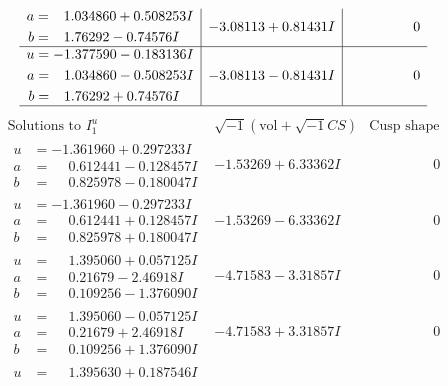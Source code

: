 \documentclass[1p]{elsarticle_modified}
\theoremstyle{definition}
\newcommand{\I}{\sqrt{-1}}
\begin{document}
$$\begin{array}{c|c|c}
\begin{aligned}
a &= \phantom{-}1.034860 + 0.508253 I \\
b &= \phantom{-}1.76292 - 0.74576 I\end{aligned}
 & -3.08113 + 0.81431 I & \phantom{-0.000000 } 0 \\ \hline\begin{aligned}
u &= -1.377590 - 0.183136 I \\
a &= \phantom{-}1.034860 - 0.508253 I \\
b &= \phantom{-}1.76292 + 0.74576 I\end{aligned}
 & -3.08113 - 0.81431 I & \phantom{-0.000000 } 0\\
 \hline 
 \end{array}$$\newpage$$\begin{array}{c|c|c}  
\text{Solutions to }I^u_{1}& \I (\text{vol} + \sqrt{-1}CS) & \text{Cusp shape}\\
 \hline 
\begin{aligned}
u &= -1.361960 + 0.297233 I \\
a &= \phantom{-}0.612441 - 0.128457 I \\
b &= \phantom{-}0.825978 - 0.180047 I\end{aligned}
 & -1.53269 + 6.33362 I & \phantom{-0.000000 } 0 \\ \hline\begin{aligned}
u &= -1.361960 - 0.297233 I \\
a &= \phantom{-}0.612441 + 0.128457 I \\
b &= \phantom{-}0.825978 + 0.180047 I\end{aligned}
 & -1.53269 - 6.33362 I & \phantom{-0.000000 } 0 \\ \hline\begin{aligned}
u &= \phantom{-}1.395060 + 0.057125 I \\
a &= \phantom{-}0.21679 - 2.46918 I \\
b &= \phantom{-}0.109256 - 1.376090 I\end{aligned}
 & -4.71583 - 3.31857 I & \phantom{-0.000000 } 0 \\ \hline\begin{aligned}
u &= \phantom{-}1.395060 - 0.057125 I \\
a &= \phantom{-}0.21679 + 2.46918 I \\
b &= \phantom{-}0.109256 + 1.376090 I\end{aligned}
 & -4.71583 + 3.31857 I & \phantom{-0.000000 } 0 \\ \hline\begin{aligned}
u &= \phantom{-}1.395630 + 0.187546 I \\

\end{aligned}
\end{array}$$
\end{document}
